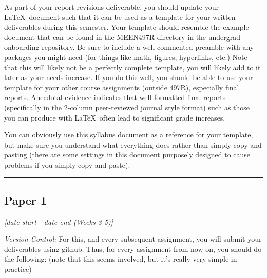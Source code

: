 \documentclass[12pt]{article}
\begin{document}
As part of your report revisions deliverable, you should update your \LaTeX~document such that it can be used as a template for your written deliverables during this semester.
Your template should resemble the example document that can be found in the MEEN497R directory in the undergrad-onboarding repository.
Be sure to include a well commented preamble with any packages you might need (for things like math, figures, hyperlinks, etc.)
Note that this will likely not be a perfectly complete template, you will likely add to it later as your needs increase.  If you do this well, you should be able to use your template for your other course assignments (outside 497R), especially final reports.  Anecdotal evidence indicates that well formatted final reports (specifically in the 2-column peer-reviewed journal style format) such as those you can produce with \LaTeX~often lead to significant grade increases.

You can obviously use this syllabus document as a reference for your template, but make sure you understand what everything does rather than simply copy and pasting (there are some settings in this document purposely designed to cause problems if you simply copy and paste).



\vspace{1em}\hrule\vspace{1em}
\subsection{Paper 1}
\label{ssec:p1}
\textit{[date start - date end (Weeks 3-5)]}

\bigskip

\noindent \textit{Version Control:}
For this, and every subsequent assignment, you will submit your deliverables using github.  Thus, for every assignment from now on, you should do the following: (note that this seems involved, but it's really very simple in practice)
\end{document}
